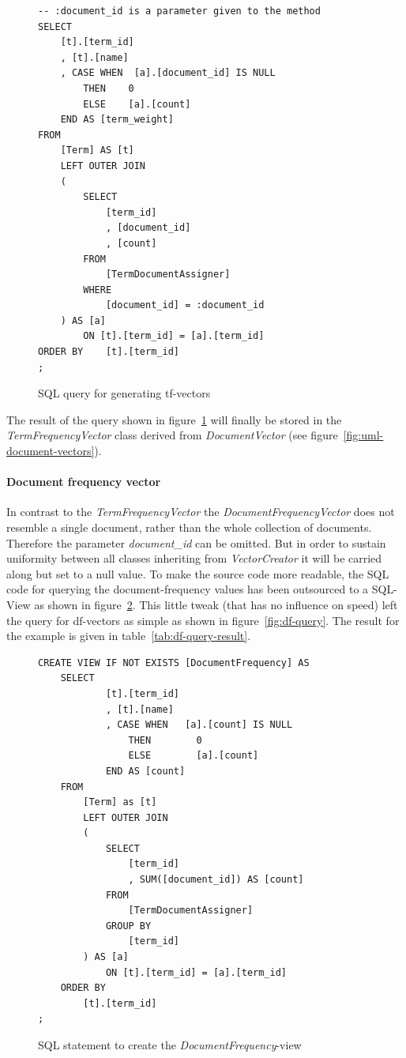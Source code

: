 \begin{figure}[h]
    \lstset{language=SQL}
    \begin{lstlisting}
-- :document_id is a parameter given to the method
SELECT
    [t].[term_id]
    , [t].[name]
    , CASE WHEN  [a].[document_id] IS NULL
        THEN    0
        ELSE    [a].[count]
    END AS [term_weight]
FROM
    [Term] AS [t]
    LEFT OUTER JOIN
    (
        SELECT
            [term_id]
            , [document_id]
            , [count]
        FROM
            [TermDocumentAssigner]
        WHERE
            [document_id] = :document_id
    ) AS [a]
        ON [t].[term_id] = [a].[term_id]
ORDER BY    [t].[term_id]
;
    \end{lstlisting}
    \caption{SQL query for generating tf-vectors}
    \label{fig:tf-query}
\end{figure}

\noindent
The result of the query shown in figure~\ref{fig:tf-query} will finally be stored in the \textit{TermFrequencyVector} class derived from \textit{DocumentVector} (see figure~\ref{fig:uml-document-vectors}).

\paragraph{Document frequency vector}
In contrast to the \textit{TermFrequencyVector} the \textit{DocumentFrequencyVector} does not resemble a single document, rather than the whole collection of documents.
Therefore the parameter \textit{document\_id} can be omitted.
But in order to sustain uniformity between all classes inheriting from \textit{VectorCreator} it will be carried along but set to a null value.
To make the source code more readable, the SQL code for querying the document-frequency values has been outsourced to a SQL-View as shown in figure~\ref{fig:df-view}.
This little tweak (that has no influence on speed) left the query for df-vectors as simple as shown in figure~\ref{fig:df-query}.
The result for the example is given in table~\ref{tab:df-query-result}.

\begin{figure}[h]
    \lstset{language=SQL}
    \begin{lstlisting}
CREATE VIEW IF NOT EXISTS [DocumentFrequency] AS
    SELECT
            [t].[term_id]
            , [t].[name]
            , CASE WHEN   [a].[count] IS NULL
                THEN        0
                ELSE        [a].[count]
            END AS [count]
    FROM
        [Term] as [t]
        LEFT OUTER JOIN
        (
            SELECT
                [term_id]
                , SUM([document_id]) AS [count]
            FROM
                [TermDocumentAssigner]
            GROUP BY
                [term_id]
        ) AS [a]
            ON [t].[term_id] = [a].[term_id]
    ORDER BY
        [t].[term_id]
;
    \end{lstlisting}
    \caption{SQL statement to create the \textit{DocumentFrequency}-view}
    \label{fig:df-view}
\end{figure}

